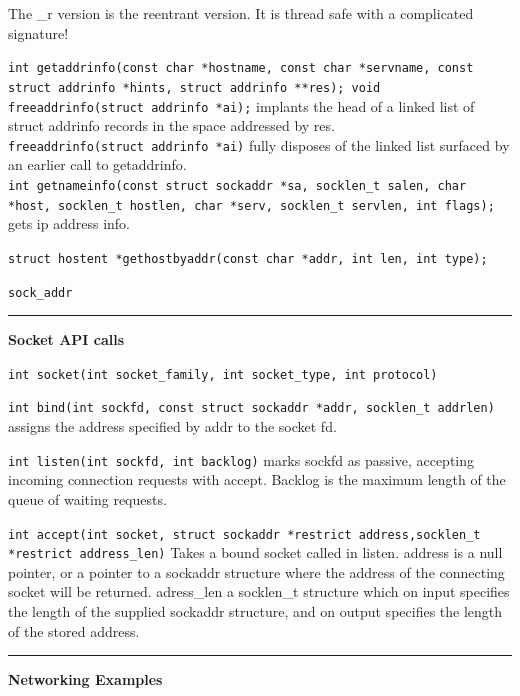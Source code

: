 \documentclass{article}
\begin{document}
\begin{multicols}{2}
  The \_r version is the reentrant version. It is thread safe with a complicated
  signature!

  {\tt int getaddrinfo(const char *hostname, const char *servname,
  const struct addrinfo *hints, struct addrinfo **res);
  void freeaddrinfo(struct addrinfo *ai);} implants the head of a
  linked list of struct addrinfo records in the space addressed by
  res.\\
  {\tt freeaddrinfo(struct addrinfo *ai)} fully disposes of the linked list
  surfaced by an earlier call to getaddrinfo.\\
  {\tt int getnameinfo(const struct sockaddr *sa, socklen\_t salen,
  char *host, socklen\_t hostlen,
  char *serv, socklen\_t servlen, int flags);} gets ip address info.

  {\tt struct hostent *gethostbyaddr(const char *addr, int len, int type);}

  {\tt sock\_addr}

  \noindent\rule{4cm}{0.4pt}

  {\bf Socket API calls}

  {\tt int socket(int socket\_family, int socket\_type, int protocol)}

  {\tt int bind(int sockfd, const struct sockaddr *addr, socklen\_t addrlen)}
  assigns the address specified by addr to the socket fd.

  {\tt int listen(int sockfd, int backlog)} marks sockfd as passive, accepting
  incoming connection requests with accept. Backlog is the maximum length of the
  queue of waiting requests.

  {\tt int accept(int socket, struct sockaddr *restrict address,socklen\_t
  *restrict address\_len)} Takes a bound socket called in listen. address is a
  null pointer, or a pointer to a sockaddr structure where the address of the
  connecting socket will be returned. adress\_len a socklen\_t structure which on
  input specifies the length of the supplied sockaddr structure, and on output
  specifies the length of the stored address.

  \noindent\rule{4cm}{0.4pt}

  {\bf Networking Examples}


\end{multicols}
\end{document}
